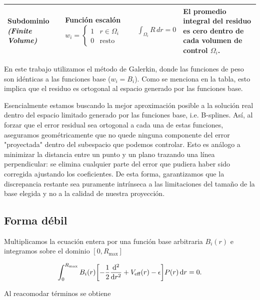 \documentclass[12pt, a4paper, oneside, spanish]{book}
\begin{document}
\begin{table}[htbp]
\begin{tabularx}{\textwidth}{ 
        >{\RaggedRight\bfseries}m{2.5cm}  
        >{\RaggedRight}m{3.5cm}           
        >{\centering}m{3.5cm}             
        >{\RaggedRight\arraybackslash}X   
    }
        Subdominio \newline \textit{\footnotesize (Finite \newline Volume)} & 
        Función escalón \newline $w_i = \begin{cases} 1 & r \in \Omega_i \\ 0 & \text{resto} \end{cases}$ & 
        $\displaystyle \int_{\Omega_i} R \, dr = 0$ & 
        El \textbf{promedio integral} del residuo es cero dentro de cada volumen de control $\Omega_i$. \\
        \bottomrule
    \end{tabularx}
\end{table}

En este trabajo utilizamos el método de Galerkin, donde las funciones de peso son idénticas a las funciones base (\( w_i = B_i \)). Como se menciona en la tabla, esto implica que el residuo es ortogonal al espacio generado por las funciones base.

Esencialmente estamos buscando la mejor aproximación posible a la solución real dentro del espacio limitado generado por las funciones base, i.e. B-splines. Así, al forzar que el error residual sea ortogonal a cada una de estas funciones, aseguramos geométricamente que no quede ninguna componente del error "proyectada" dentro del subespacio que podemos controlar. Esto es análogo a minimizar la distancia entre un punto y un plano trazando una línea perpendicular: se elimina cualquier parte del error que pudiera haber sido corregida ajustando los coeficientes. De esta forma, garantizamos que la discrepancia restante sea puramente intrínseca a las limitaciones del tamaño de la base elegida y no a la calidad de nuestra proyección.

\subsection{Forma débil}

Multiplicamos la ecuación entera por una función base arbitraria \( B_i(r) \) e integramos sobre el dominio \( [0,R_{\text{max}}] \)

\begin{equation}
\label{eq:mwr1}
  \int_{0}^{R_{\text{max}}} B_i(r) \qty[ -\frac{1}{2}\dv[2]{r} + V_{\text{eff}}(r) - \epsilon ] P(r) \dd{r} = 0.
\end{equation}

Al reacomodar términos se obtiene
\end{document}
